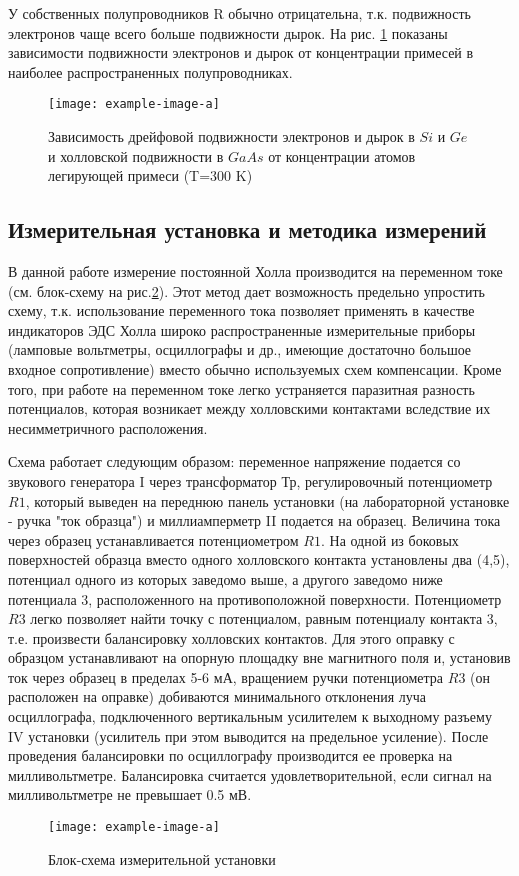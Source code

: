 У собственных полупроводников R обычно отрицательна, т.к. подвижность электронов чаще всего больше подвижности дырок. На рис. \ref{fig:9} показаны зависимости подвижности электронов и дырок от концентрации примесей в наиболее распространенных полупроводниках.

\begin{figure}[h!]
	\centering
	\texttt{[image: example-image-a]}
	\caption{Зависимость дрейфовой подвижности электронов и дырок в $Si$ и $Ge$ и холловской подвижности в $GaAs$ от концентрации атомов легирующей примеси (T=300 K)}
	\label{fig:9}
\end{figure}

\subsection{Измерительная установка и методика измерений}

В данной работе измерение постоянной Холла производится на переменном токе (см. блок-схему на рис.\ref{fig:10}). Этот метод дает возможность предельно упростить схему, т.к. использование переменного тока позволяет применять в качестве индикаторов ЭДС Холла широко распространенные измерительные приборы (ламповые вольтметры, осциллографы и др., имеющие достаточно большое входное сопротивление) вместо обычно используемых схем компенсации. Кроме того, при работе на переменном токе легко устраняется паразитная разность потенциалов, которая возникает между холловскими контактами вследствие их несимметричного расположения.

Схема работает следующим образом: переменное напряжение подается со звукового генератора I через трансформатор Тр, регулировочный потенциометр $R1$, который выведен на переднюю панель установки (на лабораторной установке - ручка "ток образца") и миллиамперметр II подается на образец. Величина тока через образец устанавливается потенциометром $R1$. На одной из боковых поверхностей образца вместо одного холловского контакта установлены два (4,5), потенциал одного из которых заведомо выше, а другого заведомо ниже потенциала 3, расположенного на противоположной поверхности. Потенциометр $R3$ легко позволяет найти точку с потенциалом, равным потенциалу контакта 3, т.е. произвести балансировку холловских контактов. Для этого оправку с образцом устанавливают на опорную площадку вне магнитного поля и, установив ток через образец в пределах 5-6 мА, вращением ручки потенциометра $R3$ (он расположен на оправке) добиваются минимального отклонения луча осциллографа, подключенного вертикальным усилителем к выходному разъему IV установки (усилитель при этом выводится на предельное усиление). После проведения балансировки по осциллографу производится ее проверка на милливольтметре. Балансировка считается удовлетворительной, если сигнал на милливольтметре не превышает 0.5 мВ. 
\begin{figure}[h!]
	\centering
	\texttt{[image: example-image-a]}
	\caption{Блок-схема измерительной установки}
	\label{fig:10}
\end{figure}

